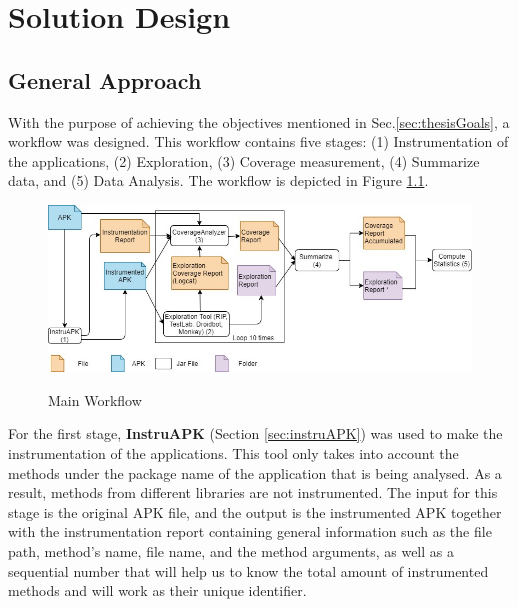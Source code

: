 
\chapter{Solution Design} %

\label{Chapter4} %

\section{General Approach} \label{sec:generalApproach}

With the purpose of achieving the objectives mentioned in Sec.\ref{sec:thesisGoals}, a workflow was designed. This workflow contains five stages: (1) Instrumentation of the applications, (2) Exploration, (3) Coverage measurement, (4) Summarize data, and (5)  Data Analysis. The workflow is depicted in Figure \ref{fig:workflow}.

\begin{figure}[h]
\centering
\includegraphics[width=\textwidth]{../Figures/workflow.jpg}
\label{fig:workflow}
\caption{Main Workflow}
\end{figure}

For the first stage, \textbf{InstruAPK} (Section \ref{sec:instruAPK}) was used to make the instrumentation of the applications. This tool only takes into account the methods under the package name of the application that is being analysed. As a result, methods from different libraries are not instrumented. The input for this stage is the original APK file, and the output is the instrumented APK together with the instrumentation report containing general information such as the file path, method's name, file name, and the method arguments, as well as a sequential number that will help us to know the total amount of instrumented methods and will work as their unique identifier.

